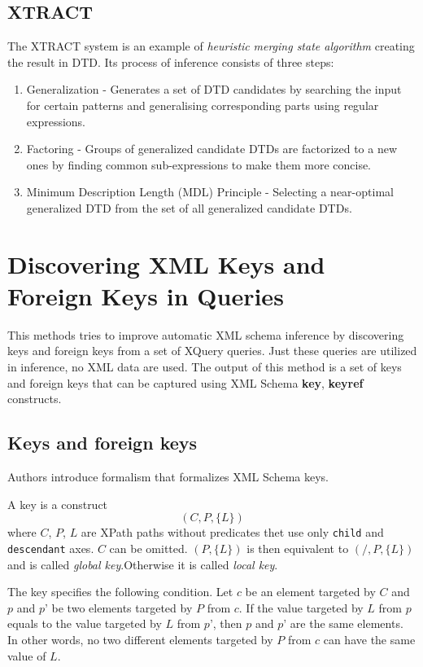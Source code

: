\subsection{XTRACT}
The XTRACT  system is an example of \emph{heuristic} \emph{merging state algorithm} creating the result in DTD. Its process of inference consists of three steps:
\begin{enumerate}
\item Generalization - Generates a set of DTD candidates by searching the input for certain patterns and generalising corresponding parts using regular expressions.
\item Factoring - Groups of generalized candidate DTDs are factorized to a new ones by finding common sub-expressions to make them more concise.
\item Minimum Description Length (MDL) Principle - Selecting a near-optimal generalized DTD from the set of all generalized candidate DTDs.
\end{enumerate}


\section{Discovering XML Keys and Foreign Keys in Queries}
This methods tries to improve automatic XML schema inference by discovering keys and foreign keys from a set of XQuery queries. Just these queries are utilized in inference, no XML data are used. The output of this method is a set of keys and foreign keys that can be captured using XML Schema \textbf{key}, \textbf{keyref}  constructs.

\subsection{Keys and foreign keys}
Authors introduce formalism that formalizes XML Schema keys.

\begin{define}[Key]
A key is a construct $$(C, P, \{L\})$$ where $C$, $P$, $L$ are XPath paths without predicates thet use only \texttt{child} and \texttt{descendant} axes.
$C$ can be omitted. $(P, \{L\})$ is then equivalent to $(/, P, \{L\})$ and is called \emph{global key}.Otherwise it is called \emph{local key}.
\end{define}

The key specifies the following condition. Let $c$ be an element targeted by $C$ and $p$ and $p’$ be two elements targeted by $P$ from $c$. If the value targeted by $L$ from $p$ equals to the value targeted by $L$ from $p’$, then $p$ and $p’$ are the same elements. In other words, no two different elements targeted by $P$ from $c$ can have the same value of $L$.

